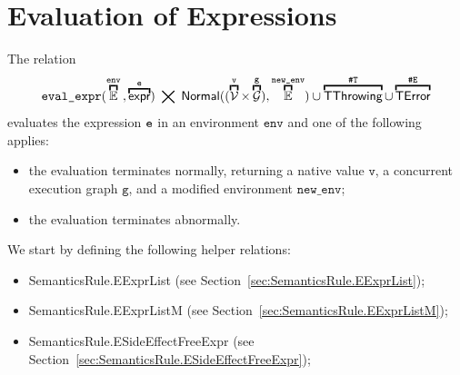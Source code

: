 \documentclass{book}
\newcommand\overname[2]{\overbracket{#1}^{#2}}
\newcommand\XGraphs[0]{\mathcal{G}}
\newcommand\vals[0]{\mathcal{V}}
\newcommand\aslrel[0]{\bigtimes}
\newcommand\aslsep[0]{\mathbf{,}}
\newcommand\ThrowingConfig[0]{\texttt{\#T}}
\newcommand\ErrorConfig[0]{\texttt{\#E}}
\newcommand\TError[0]{\textsf{TError}}
\newcommand\TThrowing[0]{\textsf{TThrowing}}
\newcommand\evalexpr[1]{\texttt{eval\_expr}(#1)}
\newcommand\Normal[0]{\textsf{Normal}}
\newcommand\newenv[0]{\texttt{new\_env}}
\newcommand\env[0]{\texttt{env}}
\newcommand\vg[0]{\texttt{g}}
\newcommand\vv[0]{\texttt{v}}
\begin{document}
\chapter{Evaluation of Expressions \label{chap:eval_expr}}

The relation
\[
  \evalexpr{\overname{\envs}{\env} \aslsep \overname{\expr}{\ve}} \;\aslrel\;
            \Normal((\overname{\vals}{\vv} \times \overname{\XGraphs}{\vg}) \aslsep \overname{\envs}{\newenv}) \cup
            \overname{\TThrowing}{\ThrowingConfig} \cup \overname{\TError}{\ErrorConfig}
\]
evaluates the expression $\texttt{e}$ in an environment $\env$ and one of the following applies:
\begin{itemize}
  \item the evaluation terminates normally, returning a native value $\vv$, a concurrent execution graph $\vg$,
  and a modified environment $\newenv$;
  \item the evaluation terminates abnormally.
\end{itemize}

We start by defining the following helper relations:
\begin{itemize}
  \item SemanticsRule.EExprList (see Section~\ref{sec:SemanticsRule.EExprList});
  \item SemanticsRule.EExprListM (see Section~\ref{sec:SemanticsRule.EExprListM});
  \item SemanticsRule.ESideEffectFreeExpr (see Section~\ref{sec:SemanticsRule.ESideEffectFreeExpr});
\end{itemize}
\end{document}
